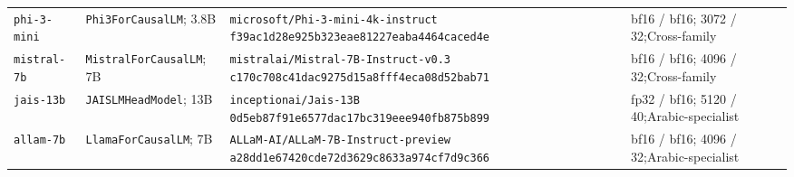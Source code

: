 \documentclass[pdflatex,sn-basic]{sn-jnl}
\begin{document}
\begin{longtable}{@{}>{\raggedright\arraybackslash}p{1.45cm}
>{\raggedright\arraybackslash}p{2.25cm}
>{\raggedright\arraybackslash}p{4.35cm}
>{\raggedright\arraybackslash}p{2.35cm}@{}}
\texttt{phi-3-}\newline\texttt{mini} & \texttt{Phi3For}\newline\texttt{CausalLM}; 3.8B & \texttt{microsoft/}\newline\texttt{Phi-3-mini-4k-instruct}\newline
\texttt{f39ac1d28e}\newline\texttt{925b323eae}\newline\texttt{81227eaba4}\newline\texttt{464caced4e} & bf16 / bf16; 3072 / 32;\newline Cross-family \\
\texttt{mistral-}\newline\texttt{7b} & \texttt{MistralFor}\newline\texttt{CausalLM}; 7B & \texttt{mistralai/}\newline\texttt{Mistral-7B-Instruct-v0.3}\newline
\texttt{c170c708c4}\newline\texttt{1dac9275d1}\newline\texttt{5a8fff4eca}\newline\texttt{08d52bab71} & bf16 / bf16; 4096 / 32;\newline Cross-family \\
\texttt{jais-13b} & \texttt{JAISLMHead}\newline\texttt{Model}; 13B & \texttt{inceptionai/Jais-13B}\newline
\texttt{0d5eb87f91}\newline\texttt{e6577dac17}\newline\texttt{bc319eee94}\newline\texttt{0fb875b899} & fp32 / bf16; 5120 / 40;\newline Arabic-specialist \\
\texttt{allam-7b} & \texttt{LlamaFor}\newline\texttt{CausalLM}; 7B & \texttt{ALLaM-AI/}\newline\texttt{ALLaM-7B-Instruct-preview}\newline
\texttt{a28dd1e674}\newline\texttt{20cde72d36}\newline\texttt{29c8633a97}\newline\texttt{4cf7d9c366} & bf16 / bf16; 4096 / 32;\newline Arabic-specialist \\
\end{longtable}
\normalsize
\end{document}
